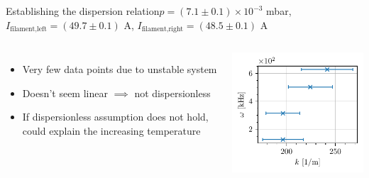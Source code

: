 \documentclass[10pt]{beamer}
\newcommand{\filamentcurrent}{\ensuremath{I_{\mathrm{filament}}}}
\begin{document}
\begin{frame}{Establishing the dispersion relation}{$p = (7.1 \pm 0.1) \times 10^{-3}$ mbar, $I_\text{filament,left} = (49.7 \pm 0.1)$ A, $I_\text{filament,right} = (48.5 \pm 0.1)$ A}
    \begin{columns}
        \centering
        \vspace{-1cm}
        \begin{itemize}
            \item Very few data points due to unstable system
            \item Doesn't seem linear $\implies$ not dispersionless
            \item If dispersionless assumption does not hold, could explain the increasing temperature
        \end{itemize}
        
        \centering
        \includegraphics[scale=1]{../figures/dispersion_relation.pdf}
    \end{columns}
\end{frame}



\end{document}
